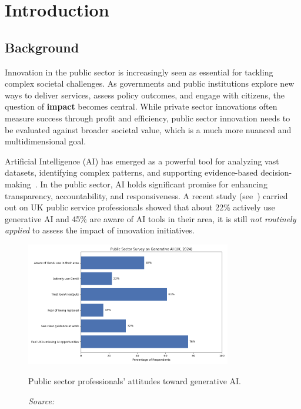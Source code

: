 
\chapter{Introduction}\label{ch:introduction}


\section{Background}\label{sec:background}

Innovation in the public sector is increasingly seen as essential for tackling complex societal challenges.
As governments and public institutions explore new ways to deliver services, assess policy outcomes, and engage with citizens, the question of \textbf{impact} becomes central.
While private sector innovations often measure success through profit and efficiency, public sector innovation needs to be evaluated against broader societal value, which is a much more nuanced and multidimensional goal.

Artificial Intelligence (AI) has emerged as a powerful tool for analyzing vast datasets, identifying complex patterns, and supporting evidence-based decision-making~\parencite{russell2016artificial, marr2018data}.
In the public sector, AI holds significant promise for enhancing transparency, accountability, and responsiveness.
A recent study (see~\cite{cornell2024}) carried out on UK public service professionals showed that about 22\% actively use generative AI and 45\% are aware of AI tools in their area, it is still \textit{not routinely applied} to assess the impact of innovation initiatives.


\begin{figure}[H]
  \centering
  \includegraphics[width=0.8\textwidth]{../fig/ai_awareness_uk}
  \caption{Public sector professionals' attitudes toward generative AI.}
  \label{fig:genai_survey}
  \caption*{\textit{Source:}~\parencite{cornell2024}}
\end{figure}


